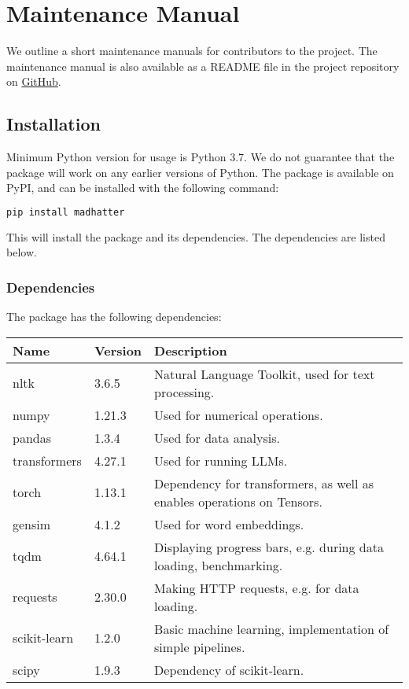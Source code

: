 \chapter{Maintenance Manual}

We outline a short maintenance manuals for contributors to the project. The maintenance manual is also available as a README file in the project repository on \href{https://github.com/Rinto-kun/madhatter}{GitHub}.

\section{Installation}
Minimum Python version for usage is Python 3.7. We do not guarantee that the package will work on any earlier versions of Python.
The package is available on PyPI, and can be installed with the following command:

\begin{lstlisting}[language=bash]
    pip install madhatter
\end{lstlisting}

This will install the package and its dependencies. The dependencies are listed below.

\subsection{Dependencies}
The package has the following dependencies:

\begin{table}[htbp]
    \centering
    \begin{tabular}{lll}
        \toprule
        \textbf{Name} & \textbf{Version} & \textbf{Description} \\
        \midrule
        nltk & 3.6.5 & Natural Language Toolkit, used for text processing. \\
        numpy & 1.21.3 & Used for numerical operations. \\
        pandas & 1.3.4 & Used for data analysis. \\
        transformers & 4.27.1 & Used for running LLMs. \\
        torch & 1.13.1 & Dependency for transformers, as well as enables operations on Tensors. \\
        gensim & 4.1.2 & Used for word embeddings. \\
        tqdm & 4.64.1 & Displaying progress bars, e.g. during data loading, benchmarking. \\
        requests & 2.30.0 & Making HTTP requests, e.g. for data loading. \\
        scikit-learn & 1.2.0 & Basic machine learning, implementation of simple pipelines. \\
        scipy & 1.9.3 & Dependency of scikit-learn. \\

        \bottomrule
    \end{tabular}
\end{table}

